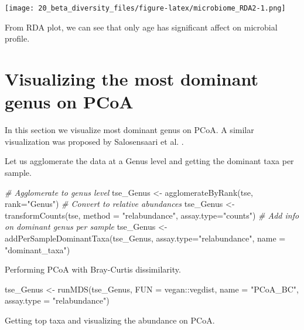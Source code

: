 \documentclass[
]{book}
\newenvironment{Shaded}{\begin{snugshade}}{\end{snugshade}}
\newcommand{\AttributeTok}[1]{\textcolor[rgb]{0.77,0.63,0.00}{#1}}
\newcommand{\CommentTok}[1]{\textcolor[rgb]{0.56,0.35,0.01}{\textit{#1}}}
\newcommand{\FunctionTok}[1]{\textcolor[rgb]{0.00,0.00,0.00}{#1}}
\newcommand{\NormalTok}[1]{#1}
\newcommand{\OtherTok}[1]{\textcolor[rgb]{0.56,0.35,0.01}{#1}}
\newcommand{\SpecialCharTok}[1]{\textcolor[rgb]{0.00,0.00,0.00}{#1}}
\newcommand{\StringTok}[1]{\textcolor[rgb]{0.31,0.60,0.02}{#1}}
\begin{document}
\texttt{[image: 20\_beta\_diversity\_files/figure-latex/microbiome\_RDA2-1.png]}

From RDA plot, we can see that only age has significant affect on microbial profile.

\hypertarget{pcoa-genus}{%
\section{Visualizing the most dominant genus on PCoA}\label{pcoa-genus}}

In this section we visualize most dominant genus on PCoA. A similar visualization was proposed by Salosensaari et al. \citeyearpar{Salosensaari2021}.

Let us agglomerate the data at a Genus level and getting the dominant taxa per sample.

\begin{Shaded}
\begin{Highlighting}[]
\CommentTok{\# Agglomerate to genus level}
\NormalTok{tse\_Genus }\OtherTok{\textless{}{-}} \FunctionTok{agglomerateByRank}\NormalTok{(tse, }\AttributeTok{rank=}\StringTok{"Genus"}\NormalTok{)}
\CommentTok{\# Convert to relative abundances}
\NormalTok{tse\_Genus }\OtherTok{\textless{}{-}} \FunctionTok{transformCounts}\NormalTok{(tse, }\AttributeTok{method =} \StringTok{"relabundance"}\NormalTok{, }\AttributeTok{assay.type=}\StringTok{"counts"}\NormalTok{)}
\CommentTok{\# Add info on dominant genus per sample}
\NormalTok{tse\_Genus }\OtherTok{\textless{}{-}} \FunctionTok{addPerSampleDominantTaxa}\NormalTok{(tse\_Genus, }\AttributeTok{assay.type=}\StringTok{"relabundance"}\NormalTok{, }\AttributeTok{name =} \StringTok{"dominant\_taxa"}\NormalTok{)}
\end{Highlighting}
\end{Shaded}

Performing PCoA with Bray-Curtis dissimilarity.

\begin{Shaded}
\begin{Highlighting}[]
\NormalTok{tse\_Genus }\OtherTok{\textless{}{-}} \FunctionTok{runMDS}\NormalTok{(tse\_Genus, }\AttributeTok{FUN =}\NormalTok{ vegan}\SpecialCharTok{::}\NormalTok{vegdist,}
              \AttributeTok{name =} \StringTok{"PCoA\_BC"}\NormalTok{, }\AttributeTok{assay.type =} \StringTok{"relabundance"}\NormalTok{)}
\end{Highlighting}
\end{Shaded}

Getting top taxa and visualizing the abundance on PCoA.
\end{document}
